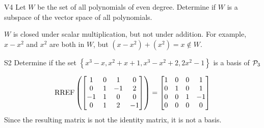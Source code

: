\documentclass{sbgLAquiz}
\begin{document}
\begin{extract}\newpage\end{extract}
\begin{problem}{V4} Let $W$ be the set of all polynomials of even degree.  Determine if $W$ is a subspace of the vector space of all polynomials.
\end{problem}
\begin{solution}
$W$ is closed under scalar multiplication, but not under addition.  For example, $x-x^2$ and $x^2$ are both in $W$, but $(x-x^2)+(x^2)=x \notin W$.
\end{solution}


\begin{problem}{S2}
Determine if the set $\left\{ x^3-x, x^2+x+1, x^3-x^2+2, 2x^2-1 \right\}$ is a basis of $\P_3$
\end{problem}
\begin{solution}
$$\RREF\left(\begin{bmatrix} 1 & 0 & 1 & 0 \\ 0 & 1 & -1 & 2 \\ -1 & 1 & 0 & 0 \\ 0 & 1 & 2 & -1 \end{bmatrix} \right)= \begin{bmatrix} 1 & 0 &0 & 1 \\ 0 & 1 & 0 & 1 \\ 0 & 0 & 1 & -1 \\ 0 & 0 & 0 & 0 \end{bmatrix}$$
Since the resulting matrix is not the identity matrix, it is not a basis.
\end{solution}
\end{document}
